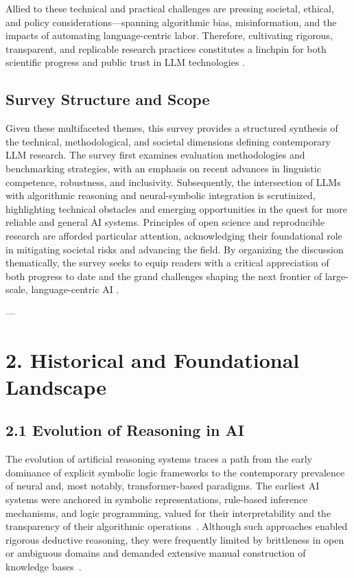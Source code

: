 \documentclass[11pt]{article}
\begin{document}
Allied to these technical and practical challenges are pressing societal, ethical, and policy considerations—spanning algorithmic bias, misinformation, and the impacts of automating language-centric labor. Therefore, cultivating rigorous, transparent, and replicable research practices constitutes a linchpin for both scientific progress and public trust in LLM technologies \cite{ref42,ref54,ref86}.

\subsection{Survey Structure and Scope}

Given these multifaceted themes, this survey provides a structured synthesis of the technical, methodological, and societal dimensions defining contemporary LLM research. The survey first examines evaluation methodologies and benchmarking strategies, with an emphasis on recent advances in linguistic competence, robustness, and inclusivity. Subsequently, the intersection of LLMs with algorithmic reasoning and neural-symbolic integration is scrutinized, highlighting technical obstacles and emerging opportunities in the quest for more reliable and general AI systems. Principles of open science and reproducible research are afforded particular attention, acknowledging their foundational role in mitigating societal risks and advancing the field. By organizing the discussion thematically, the survey seeks to equip readers with a critical appreciation of both progress to date and the grand challenges shaping the next frontier of large-scale, language-centric AI \cite{ref42,ref49,ref54,ref86}.


---

\section{2. Historical and Foundational Landscape}

\subsection{2.1 Evolution of Reasoning in AI}

The evolution of artificial reasoning systems traces a path from the early dominance of explicit symbolic logic frameworks to the contemporary prevalence of neural and, most notably, transformer-based paradigms. The earliest AI systems were anchored in symbolic representations, rule-based inference mechanisms, and logic programming, valued for their interpretability and the transparency of their algorithmic operations~\cite{ref42,ref49,ref54,ref86}. Although such approaches enabled rigorous deductive reasoning, they were frequently limited by brittleness in open or ambiguous domains and demanded extensive manual construction of knowledge bases~\cite{ref86}.
\end{document}
